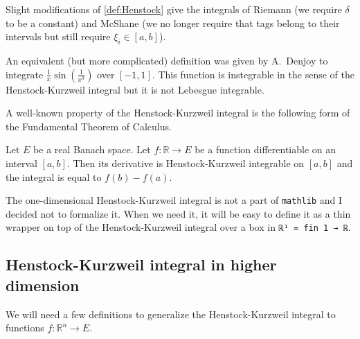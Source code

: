 \documentclass[a4paper, UKenglish,cleveref, autoref, thm-restate]{lipics-v2021}
\newcommand{\bbR}{\mathbb{R}}
\begin{document}
Slight modifications of \autoref{def:Henstock} give the integrals of
Riemann (we require \(\delta\) to be a constant) and McShane (we no
longer require that tags belong to their intervals but still require
\(\xi_{i}\in[a, b]\)).

An equivalent (but more complicated) definition was given by A.~Denjoy
to integrate \(\frac{1}{x}\sin\left(\frac{1}{x^{3}}\right)\) over
\([-1, 1]\). This function is instegrable in the sense of the
Henstock-Kurzweil integral but it is not Lebesgue integrable.

A well-known property of the Henstock-Kurzweil integral is the
following form of the Fundamental Theorem of Calculus.
\begin{theorem}
  Let \(E\) be a real Banach space. Let \(f\colon \bbR\to E\) be a
  function differentiable on an interval \([a, b]\). Then its
  derivative is Henstock-Kurzweil integrable on \([a, b]\) and the
  integral is equal to \(f(b)-f(a)\).
\end{theorem}

The one-dimensional Henstock-Kurzweil integral is not a part of
\texttt{mathlib} and I decided not to formalize it. When we need it,
it will be easy to define it as a thin wrapper on top of the
Henstock-Kurzweil integral over a box in \lstinline+ℝ¹ = fin 1 → ℝ+.

\subsection{Henstock-Kurzweil integral in higher dimension}%
\label{sec:HK-integral-dim-n}

We will need a few definitions to generalize the Henstock-Kurzweil
integral to functions \(f\colon \bbR^{n}\to E\).
\end{document}
